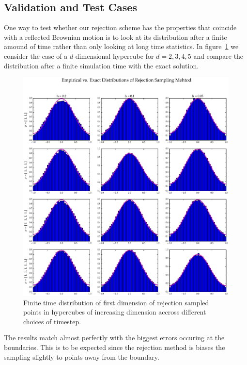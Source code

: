 
\subsection{Validation and Test Cases}

One way to test whether our rejection scheme has the properties that coincide with a reflected Brownian motion is to look at its distribution after a finite amound of time rather than only looking at long time statistics. In figure~\ref{fig:HCFin} we consider the case of a $d$-dimensional hypercube for $d = 2, 3, 4, 5$  and compare the distribution after a finite simulation time with the exact solution. 
\begin{figure}[ht]
\centering
  \includegraphics[scale=0.4, angle=0]{images/rejection_finite.eps}
\caption{Finite time distribution of first dimension of rejection sampled points in hypercubes of increasing dimension accross different choices of timestep.}
\label{fig:HCFin}
\end{figure}
The results match almost perfectly with the biggest errors occuring at the boundaries. This is to be expected since the rejection method is biases the sampling slightly to points away from the boundary. 


